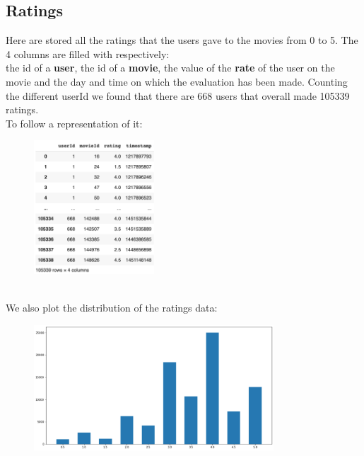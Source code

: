 \documentclass{article}
\begin{document}
\subsection{Ratings}
Here are stored all the ratings that the users gave to the movies from 0 to 5. The 4 columns are filled with respectively: \\the id of a \textbf{user}, the id of a \textbf{movie}, the value of the \textbf{rate} of the user on the movie and the day and time on which the evaluation has been made. Counting the different userId we found that there are 668 users that overall made 105339 ratings. \\
To follow a representation of it:
\begin{figure}[ht]
      \begin{center}
            \includegraphics[width=0.4\textwidth]{images/ratings data.png}
      \end{center}
\end{figure}\\
We also plot the distribution of the ratings data:
\begin{figure}[ht]
      \begin{center}
            \includegraphics[width=0.8\textwidth]{images/rating distributions.png}
      \end{center}
\end{figure}

\newpage
\end{document}
